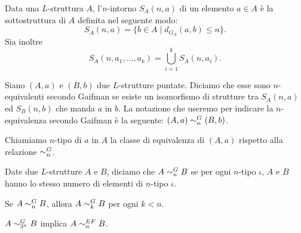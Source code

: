 \begin{definizione}
  Data una $L$-struttura $A$, l'$n$-intorno $S_A(n,a)$ di un elemento $a\in A$ è la sottostruttura di $A$ definita nel seguente modo:
  \[ S_A(n,a) = \{ b\in A \mid d_{G_A}(a,b) \leq n \}. \]
  Sia inoltre
  \[ S_A(n,a_1,\ldots,a_k) = \bigcup_{i=1}^k S_A(n,a_i). \]
\end{definizione}

\begin{definizione}
  Siano $(A,a)$ e $(B,b)$ due $L$-strutture puntate. Diciamo che esse sono $n$-equivalenti secondo Gaifman se esiste un isomorfismo di strutture tra $S_A(n,a)$ ed $S_B(n,b)$ che manda $a$ in $b$.
  La notazione che useremo per indicare la $n$-equivalenza secondo Gaifman è la seguente: $(A,a) \sim^{G}_{n} (B,b)$.
\end{definizione}

\begin{definizione}
  Chiamiamo $n$-tipo di $a$ in $A$ la classe di equivalenza di $(A,a)$ rispetto alla relazione $\sim^{G}_{n}$.
\end{definizione}

\begin{definizione}
  Date due $L$-strutture $A$ e $B$, diciamo che $A\sim^{G}_{n} B$ se per ogni $n$-tipo $\iota$, $A$ e $B$ hanno lo stesso numero di elementi di $n$-tipo $\iota$.
\end{definizione}

\begin{osservazione}
  Se $A\sim^{G}_{n} B$, allora $A\sim^{G}_{k} B$ per ogni $k<n$.
\end{osservazione}


\begin{teorema}
  \label{thm:gaifman}
  $A \sim^{G}_{3^n} B$ implica $A \sim^{EF}_n B$.
\end{teorema}

